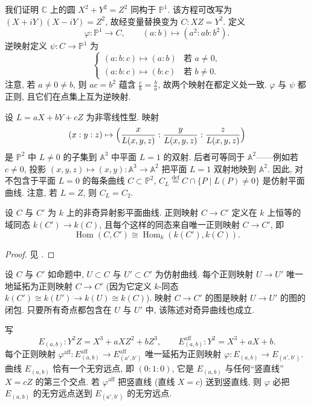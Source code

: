 \begin{example} \label{thm:1.4.17} 
我们证明 $\mathbb{C}$ 上的圆 $X^2 + Y^2 = Z^2$ 同构于 $\mathbb{P}^1$. 该方程可改写为 $(X+iY)(X-iY) = Z^2$, 故经变量替换变为 $C\colon XZ = Y^2$. 定义
\[
\varphi\colon\mathbb{P}^1\to C, \qquad (a:b)\mapsto(a^2:ab:b^2).
\]
逆映射定义 $\psi\colon C\to\mathbb{P}^1$ 为
\[
\begin{cases}
(a:b:c)\mapsto(a:b) & \text{若 } a\neq 0,\\
(a:b:c)\mapsto(b:c) & \text{若 } b\neq 0.
\end{cases}
\]
注意, 若 $a\neq 0\neq b$, 则 $ac = b^2$ 蕴含 $\frac{c}{b} = \frac{b}{a}$, 故两个映射在都定义处一致. $\varphi$ 与 $\psi$ 都正则, 且它们在点集上互为逆映射.
\end{example}

设 $L = aX + bY + cZ$ 为非零线性型. 映射
\[
(x:y:z)\mapsto\Bigl(\frac{x}{L(x,y,z)}:\frac{y}{L(x,y,z)}:\frac{z}{L(x,y,z)}\Bigr)
\]
是 $\mathbb{P}^2$ 中 $L\neq 0$ 的子集到 $\mathbb{A}^3$ 中平面 $L = 1$ 的双射. 后者可等同于 $\mathbb{A}^2$——例如若 $c\neq 0$, 投影 $(x,y,z)\mapsto(x,y)\colon\mathbb{A}^3\to\mathbb{A}^2$ 把平面 $L = 1$ 双射地映到 $\mathbb{A}^2$. 因此, 对不包含于平面 $L = 0$ 的每条曲线 $C\subset\mathbb{P}^2$, $C_L \overset{\text{def}}{=} C\cap\{P \mid L(P)\neq 0\}$ 是仿射平面曲线. 注意, 若 $L = Z$, 则 $C_L = C_2$.

\begin{proposition} \label{thm:1.4.18} 
设 $C$ 与 $C'$ 为 $k$ 上的非奇异射影平面曲线. 正则映射 $C\to C'$ 定义在 $k$ 上恒等的域同态 $k(C')\to k(C)$, 且每个这样的同态来自唯一正则映射 $C\to C'$, 即
\[
\operatorname{Hom}(C, C') \cong \operatorname{Hom}_k(k(C'), k(C)).
\]
\end{proposition}

\begin{proof}
见 \cite[\S7.5, Cor.\ to Theorem 3]{fulton1969}.
\end{proof}

\begin{remark} \label{thm:1.4.19} 
设 $C$ 与 $C'$ 如命题中, $U\subset C$ 与 $U'\subset C'$ 为仿射曲线. 每个正则映射 $U\to U'$ 唯一地延拓为正则映射 $C\to C'$ (因为它定义 $k$-同态 $k(C')\cong k(U')\to k(U)\cong k(C)$). 映射 $C\to C'$ 的图是映射 $U\to U'$ 的图的闭包. 只要所有奇点都包含在 $U$ 与 $U'$ 中, 该陈述对奇异曲线也成立.
\end{remark}

\begin{example} \label{thm:1.4.20} 
写
\[
E_{(a,b)}\colon Y^2Z = X^3 + aXZ^2 + bZ^3, \qquad
E_{(a,b)}^{\mathrm{aff}}\colon Y^2 = X^3 + aX + b.
\]
每个正则映射 $\varphi^{\mathrm{aff}}\colon E_{(a,b)}^{\mathrm{aff}}\to E_{(a',b')}^{\mathrm{aff}}$ 唯一延拓为正则映射 $\varphi\colon E_{(a,b)}\to E_{(a',b')}$. 曲线 $E_{(a,b)}$ 恰有一个无穷远点, 即 $(0:1:0)$, 它是 $E_{(a,b)}$ 与任何``竖直线'' $X = cZ$ 的第三个交点. 若 $\varphi^{\mathrm{aff}}$ 把竖直线 (直线 $X = c$) 送到竖直线, 则 $\varphi$ 必把 $E_{(a,b)}$ 的无穷远点送到 $E_{(a',b')}$ 的无穷远点.
\end{example}

